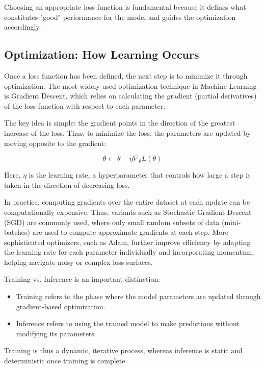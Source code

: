 \documentclass[openany]{book}
\begin{document}
Choosing an appropriate loss function is fundamental because it defines what 
constitutes "good" performance for the model and guides the optimization 
accordingly.

\subsection{Optimization: How Learning Occurs}

Once a loss function has been defined, the next step is to minimize it through 
optimization. The most widely used optimization technique in Machine Learning 
is Gradient Descent, which relies on calculating the gradient 
(partial derivatives) of the loss function with respect to each parameter.

The key idea is simple: the gradient points in the direction of the greatest 
increase of the loss. Thus, to minimize the loss, the parameters are updated by 
moving opposite to the gradient:

\begin{equation}
\theta \leftarrow \theta - \eta \nabla_\theta L(\theta)
\end{equation}

Here, $\eta$ is the learning rate, a hyperparameter that controls how large a 
step is taken in the direction of decreasing loss.

In practice, computing gradients over the entire dataset at each update can be 
computationally expensive. Thus, variants such as Stochastic Gradient Descent 
(SGD) are commonly used, where only small random subsets of data (mini-batches) 
are used to compute approximate gradients at each step. More sophisticated 
optimizers, such as Adam, further improve efficiency by adapting the learning 
rate for each parameter individually and incorporating momentum, helping 
navigate noisy or complex loss surfaces.

Training vs. Inference is an important distinction:

\begin{itemize}
    \item Training refers to the phase where the model parameters are updated 
    through gradient-based optimization.
    \item Inference refers to using the trained model to make predictions 
    without modifying its parameters.
\end{itemize}

Training is thus a dynamic, iterative process, whereas inference is static and 
deterministic once training is complete.
\end{document}

